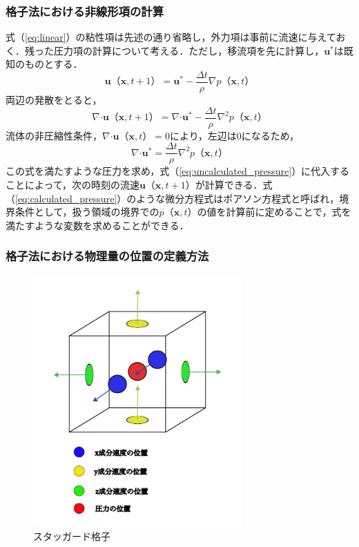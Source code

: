 \documentclass[a4j,12pt]{jreport}
\begin{document}
\subsubsection{格子法における非線形項の計算} \label{subsec:gridpressure}
式（\ref{eq:linear}）の粘性項は先述の通り省略し，外力項は事前に流速に与えておく．残った圧力項の計算について考える．ただし，移流項を先に計算し，$\bm{u}^*$は既知のものとする．
\begin{equation}\label{eq:uncalculated_pressure}
\bm{u}（\bm{x},t+1） =  \bm{u}^* - \frac{\varDelta t}{\rho}\nabla p（\bm{x},t）
\end{equation} 
両辺の発散をとると，
$$\nabla\boldsymbol{\cdot}\bm{u}（\bm{x},t+1） =  \nabla\boldsymbol{\cdot}\bm{u}^* - \frac{\varDelta t}{\rho}\nabla^2 p（\bm{x},t）$$
流体の非圧縮性条件，$\nabla\boldsymbol{\cdot}\bm{u}（\bm{x},t） = 0$により，左辺は0になるため，
\begin{equation}\label{eq:calculated_pressure}
\nabla\boldsymbol{\cdot}\bm{u}^* = \frac{\varDelta t}{\rho}\nabla^2 p（\bm{x},t）
\end{equation} 
この式を満たすような圧力を求め，式（\ref{eq:uncalculated_pressure}）に代入することによって，次の時刻の流速$\bm{u}（\bm{x},t+1）$が計算できる．式（\ref{eq:calculated_pressure}）のような微分方程式はポアソン方程式と呼ばれ，境界条件として，扱う領域の境界での$p（\bm{x},t）$の値を計算前に定めることで，式を満たすような変数を求めることができる．
\subsubsection{格子法における物理量の位置の定義方法} \label{subsec:grid_sampling}
\begin{figure}[htbp]
\begin{center}
\includegraphics[width=80mm]{3dstaggerd.png}
\caption{スタッガード格子}
\label{fig:staggerd}
\end{center}
\end{figure}
\end{document}
